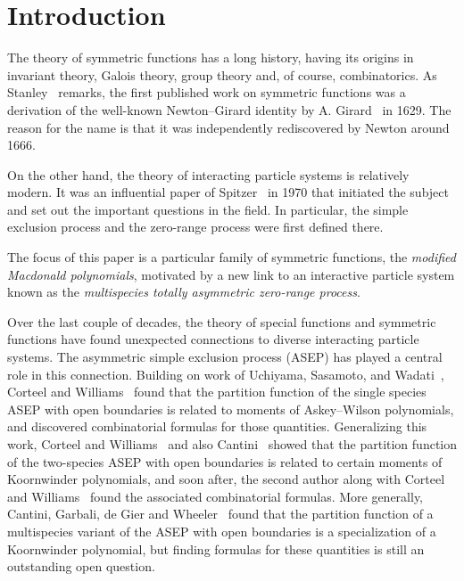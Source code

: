 \section{Introduction}


The theory of symmetric functions has a long history, having its origins in invariant theory, Galois theory, group theory and, of course, combinatorics. As Stanley~\cite[Notes in Chapter~7]{stanley-ec2} remarks, the first published work on symmetric functions was a derivation of the well-known Newton--Girard identity by A. Girard~\cite{girard-1884} in 1629. The reason for the name is that it was independently rediscovered by Newton around 1666. 

On the other hand, the theory of interacting particle systems is relatively modern. It was an influential paper of Spitzer~\cite{spitzer-1970} in 1970 that initiated the subject and set out the important questions in the field. In particular, the simple exclusion process and the zero-range process were first defined there. 

The focus of this paper is a particular family of symmetric functions, 
the \emph{modified Macdonald polynomials}, motivated by a new link 
to an interactive particle system known as the \emph{multispecies totally
asymmetric zero-range process}. 

Over the last couple of decades, the theory of special functions and symmetric functions have found unexpected connections to diverse interacting particle systems. The asymmetric simple exclusion process  (ASEP) has played a central role in this connection. Building on work of Uchiyama, Sasamoto, and Wadati~\cite{USW,sasamoto-1999}, Corteel and Williams~\cite{CW11} found that the partition function of the single species ASEP with open boundaries is related to moments of Askey--Wilson polynomials, and discovered combinatorial formulas for those quantities. Generalizing this work, Corteel and Williams~\cite{CW18} and also Cantini~\cite{cantini-2017} showed that the partition function of the two-species ASEP with open boundaries is related to certain moments of Koornwinder polynomials, and soon after, the second author along with Corteel and Williams~\cite{CMW-2017} found the associated combinatorial formulas. More generally, Cantini, Garbali, de Gier and Wheeler~\cite{cantini-etal-2016} found that the partition function of a multispecies variant of the ASEP with open boundaries is a specialization of a Koornwinder polynomial, but finding formulas for these quantities is still an outstanding open question.

